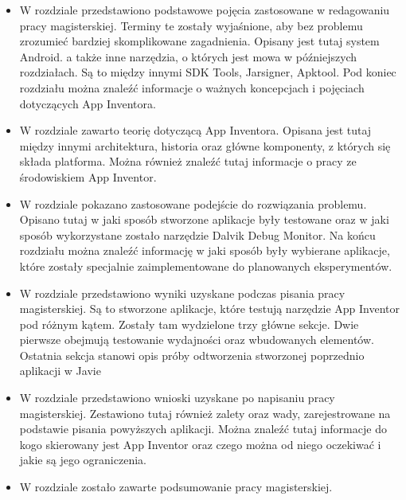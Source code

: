 \begin{itemize}
\item W rozdziale  przedstawiono podstawowe pojęcia zastosowane w redagowaniu pracy magisterskiej. Terminy te zostały wyjaśnione, aby bez problemu zrozumieć bardziej skomplikowane zagadnienia. Opisany jest tutaj system Android.
a także inne narzędzia, o których jest mowa w późniejszych rozdziałach. Są to między innymi SDK Tools, Jarsigner, Apktool.
Pod koniec rozdziału można znaleźć informacje o ważnych koncepcjach i pojęciach dotyczących App Inventora.
\item W rozdziale  zawarto teorię dotyczącą App Inventora. Opisana jest tutaj między innymi architektura, historia oraz główne komponenty, z których się składa platforma. Można również znaleźć tutaj informacje o pracy ze środowiskiem App Inventor.
\item W rozdziale  pokazano zastosowane podejście do rozwiązania problemu. Opisano tutaj w jaki sposób stworzone aplikacje były testowane oraz w jaki sposób wykorzystane zostało narzędzie Dalvik Debug Monitor. Na końcu rozdziału można znaleźć informację w jaki sposób były wybierane aplikacje, które zostały specjalnie zaimplementowane do planowanych eksperymentów.
\item W rozdziale  przedstawiono wyniki uzyskane podczas pisania pracy magisterskiej. Są to stworzone aplikacje, które testują narzędzie App Inventor pod różnym kątem. Zostały tam wydzielone trzy główne sekcje. Dwie pierwsze obejmują testowanie wydajności oraz wbudowanych elementów. Ostatnia sekcja stanowi opis próby odtworzenia stworzonej poprzednio aplikacji w Javie
\item W rozdziale  przedstawiono wnioski uzyskane po napisaniu pracy magisterskiej. Zestawiono  tutaj również zalety oraz wady, zarejestrowane na podstawie pisania powyższych aplikacji. Można znaleźć tutaj informacje do kogo skierowany jest App Inventor oraz czego można od niego oczekiwać i jakie są jego ograniczenia.
\item W rozdziale  zostało zawarte podsumowanie pracy magisterskiej.
\end{itemize}


















